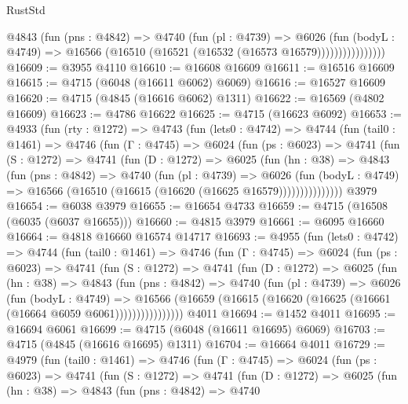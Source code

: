 \begin{lexlean}{RustStd}
\begin{coremodule}
                    @4843
                      (fun (pns : @4842) =>
                      @4740
                        (fun (pl : @4739) =>
                        @6026
                          (fun (bodyL : @4749) =>
                          @16566 (@16510 (@16521 (@16532 (@16573 @16579))))))))))))))))
@16609 := @3955 @4110
@16610 := @16608 @16609
@16611 := @16516 @16609
@16615 := @4715 (@6048 (@16611 @6062) @6069)
@16616 := @16527 @16609
@16620 := @4715 (@4845 (@16616 @6062) @1311)
@16622 := @16569 (@4802 @16609)
@16623 := @4786 @16622
@16625 := @4715 (@16623 @6092)
@16653 := @4933
    (fun (rty : @1272) =>
    @4743
      (fun (lets0 : @4742) =>
      @4744
        (fun (tail0 : @1461) =>
        @4746
          (fun (Γ : @4745) =>
          @6024
            (fun (ps : @6023) =>
            @4741
              (fun (S : @1272) =>
              @4741
                (fun (D : @1272) =>
                @6025
                  (fun (hn : @38) =>
                  @4843
                    (fun (pns : @4842) =>
                    @4740
                      (fun (pl : @4739) =>
                      @6026
                        (fun (bodyL : @4749) =>
                        @16566 (@16510 (@16615 (@16620 (@16625 @16579)))))))))))))))
    @3979
@16654 := @6038 @3979
@16655 := @16654 @4733
@16659 := @4715 (@16508 (@6035 (@6037 @16655)))
@16660 := @4815 @3979
@16661 := @6095 @16660
@16664 := @4818 @16660 @16574 @14717
@16693 := @4955
    (fun (lets0 : @4742) =>
    @4744
      (fun (tail0 : @1461) =>
      @4746
        (fun (Γ : @4745) =>
        @6024
          (fun (ps : @6023) =>
          @4741
            (fun (S : @1272) =>
            @4741
              (fun (D : @1272) =>
              @6025
                (fun (hn : @38) =>
                @4843
                  (fun (pns : @4842) =>
                  @4740
                    (fun (pl : @4739) =>
                    @6026
                      (fun (bodyL : @4749) =>
                      @16566
                        (@16659 (@16615 (@16620 (@16625 (@16661 (@16664 @6059 @6061))))))))))))))))
    @4011
@16694 := @1452 @4011
@16695 := @16694 @6061
@16699 := @4715 (@6048 (@16611 @16695) @6069)
@16703 := @4715 (@4845 (@16616 @16695) @1311)
@16704 := @16664 @4011
@16729 := @4979
    (fun (tail0 : @1461) =>
    @4746
      (fun (Γ : @4745) =>
      @6024
        (fun (ps : @6023) =>
        @4741
          (fun (S : @1272) =>
          @4741
            (fun (D : @1272) =>
            @6025
              (fun (hn : @38) =>
              @4843
                (fun (pns : @4842) =>
                @4740

\end{coremodule}
\end{lexlean}
